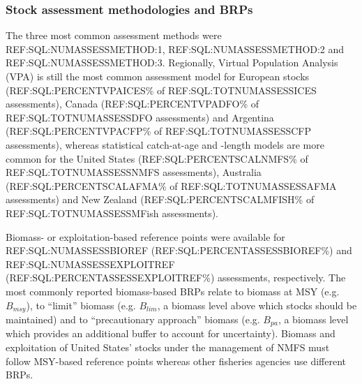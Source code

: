 \subsubsection*{Stock assessment methodologies and BRPs}

The three most common assessment methods were
REF:SQL:NUMASSESSMETHOD:1, REF:SQL:NUMASSESSMETHOD:2 and
REF:SQL:NUMASSESSMETHOD:3. Regionally, Virtual Population Analysis
(VPA) is still the most common assessment model for European stocks
(REF:SQL:PERCENTVPAICES\% of REF:SQL:TOTNUMASSESSICES assessments),
Canada (REF:SQL:PERCENTVPADFO\% of REF:SQL:TOTNUMASSESSDFO
assessments) and Argentina (REF:SQL:PERCENTVPACFP\% of
REF:SQL:TOTNUMASSESSCFP assessments), whereas statistical catch-at-age
and -length models are more common for the United States
(REF:SQL:PERCENTSCALNMFS\% of REF:SQL:TOTNUMASSESSNMFS assessments),
Australia (REF:SQL:PERCENTSCALAFMA\% of REF:SQL:TOTNUMASSESSAFMA
assessments) and New Zealand (REF:SQL:PERCENTSCALMFISH\% of
REF:SQL:TOTNUMASSESSMFish assessments).

Biomass- or exploitation-based reference points were available for
REF:SQL:NUMASSESSBIOREF (REF:SQL:PERCENTASSESSBIOREF\%) and
REF:SQL:NUMASSESSEXPLOITREF (REF:SQL:PERCENTASSESSEXPLOITREF\%)
assessments, respectively. The most commonly reported biomass-based
BRPs relate to biomass at MSY (e.g. $B_{msy}$), to ``limit'' biomass
(e.g. $B_{lim}$, a biomass level above which stocks should be
maintained) and to ``precautionary approach'' biomass (e.g.  $B_{pa}$,
a biomass level which provides an additional buffer to account for
uncertainty). Biomass and exploitation of United States' stocks under
the management of NMFS must follow MSY-based reference points whereas
other fisheries agencies use different BRPs.

